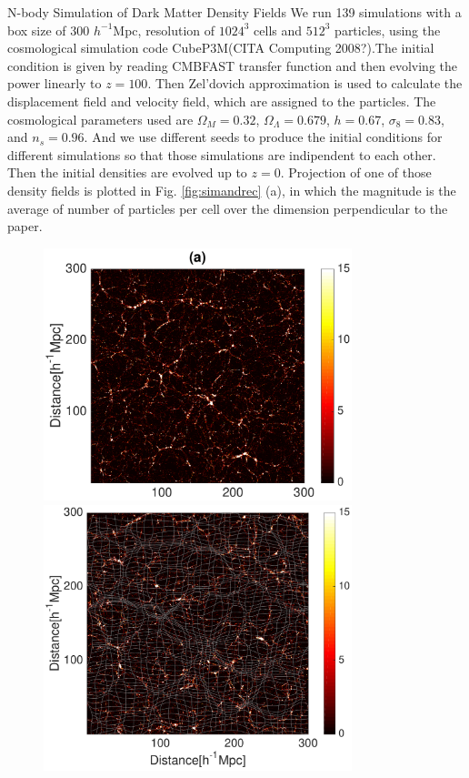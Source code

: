 \begin{section}{N-body Simulation of Dark Matter Density Fields}
  \label{sec:simulation}
    We run 139 simulations with a box size of 300 $h^{-1}$Mpc, resolution of $1024^3$ cells and $512^3$ particles, using the cosmological simulation code CubeP3M(CITA Computing 2008?).The initial condition is given by reading CMBFAST transfer function and then evolving the power linearly to $z=100$. Then Zel'dovich approximation is used to calculate the displacement field and velocity field, which are assigned to the particles. The cosmological parameters used are $\Omega_M=0.32$, $\Omega_{\Lambda}=0.679$, $h=0.67$, $\sigma_8=0.83$, and $n_s=0.96$. And we use different seeds to produce the initial conditions for different simulations so that those simulations are indipendent to each other. Then the initial densities are evolved up to $z=0$. Projection of one of those density fields is plotted in Fig. \ref{fig:simandrec} (a), in which the magnitude is the average of number of particles per cell over the dimension perpendicular to the paper.
\begin{figure}
\centering
 \includegraphics[width=0.8\textwidth]{simulation-crop.pdf}
 \includegraphics[width=0.8\textwidth]{reconstruction-crop.pdf}

\end{figure}
\end{section}
